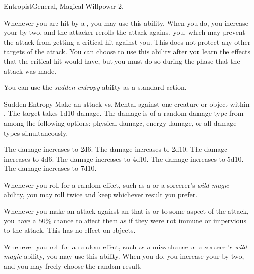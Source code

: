     \begin{feat}{Entropist}{General, Magical}
        \featpre Willpower 2.

         Whenever you are hit by a , you may use this ability.
        When you do, you increase your  by two, and the attacker rerolls the attack against you, which may prevent the attack from getting a critical hit against you.
        This does not protect any other targets of the attack.
        You can choose to use this ability after you learn the effects that the critical hit would have, but you must do so during the phase that the attack was made.

         You can use the \textit{sudden entropy} ability as a standard action.
        \begin{activeability}{Sudden Entropy}
            \rankline
            Make an attack vs. Mental against one creature or object within \medrange.
            \hit The target takes 1d10 \add {} damage.
            The damage is of a random damage type from among the following options: physical damage, energy damage, or all damage types simultaneously.

            \rankline
             The damage increases to 2d6.
             The damage increases to 2d10.
             The damage increases to 4d6.
             The damage increases to 4d10.
             The damage increases to 5d10.
             The damage increases to 7d10.
        \end{activeability}

         Whenever you roll for a random effect, such as a  or a sorcerer's \textit{wild magic} ability, you may roll twice and keep whichever result you prefer.

         Whenever you make an attack against an  that is  or  to some aspect of the attack, you have a 50\% chance to affect them as if they were not immune or impervious to the attack.
        This has no effect on objects.

         Whenever you roll for a random effect, such as a miss chance or a sorcerer's \textit{wild magic} ability, you may use this ability.
        When you do, you increase your  by two, and you may freely choose the random result.
    \end{feat}

